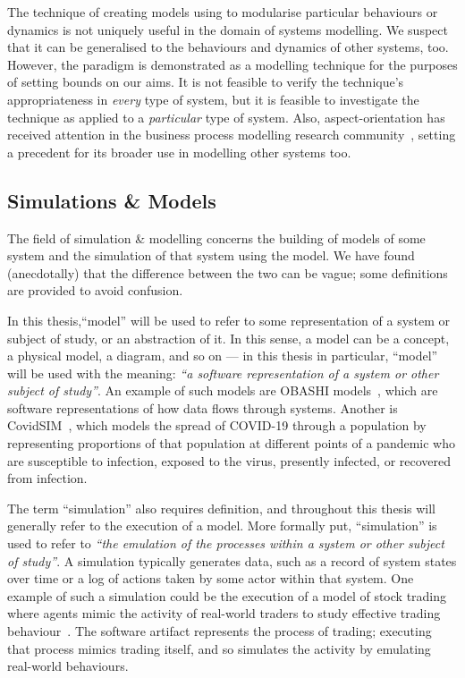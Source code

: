 The technique of creating models using \aspectorientation to modularise
particular behaviours or dynamics is not uniquely useful in the domain of
\sociotechnical systems modelling.
We suspect that it can be generalised to the behaviours and dynamics
of other systems, too. However, the paradigm is
demonstrated as a \sociotechnical modelling technique for the purposes of
setting bounds on our aims. It is not feasible to verify the
technique's appropriateness in \emph{every} type of system, but it is feasible to
investigate the technique as applied to a \emph{particular} type of system.
Also, aspect-orientation has received attention in the business process
modelling research
community~\cite{charfi2007ao4bpel,Cappelli_AOBPM,Charfi2006AspectOrientedWL},
setting a precedent for its broader use in modelling other \sociotechnical
systems too.


\subsection{Simulations \& Models}
\label{intro_defining_simulation_and_model}

The field of simulation \& modelling concerns the building of models of some
system and the simulation of that system using the model. We have found
(anecdotally) that the difference between the two can be vague; some definitions
are provided to avoid confusion.

In this thesis,``model'' will be used to refer to some representation of a
system or subject of study, or an abstraction of it. In this sense, a model can
be a concept, a physical model, a diagram, and so on --- in this thesis in
particular, ``model'' will be used with the meaning: \emph{``a software
representation of a system or other subject of study''}. An example of such
models are OBASHI models~\cite{obashimethodology}, which are software
representations of how data flows through \sociotechnical systems. Another is
CovidSIM~\cite{covidsim_tool}, which models the spread of COVID-19 through a
population by representing proportions of that population at different points of
a pandemic who are susceptible to infection, exposed to the virus, presently
infected, or recovered from infection.

The term ``simulation'' also requires definition, and throughout this thesis
will generally refer to the execution of a model. More formally put,
``simulation'' is used to refer to \emph{``the emulation of the processes within
a system or other subject of study''}. A simulation typically generates data,
such as a record of system states over time or a log of actions taken by some
actor within that system. One example of such a simulation could be the
execution of a model of stock trading where agents mimic the activity of
real-world traders to study effective trading behaviour~\cite{ZipTradersCliff}.
The software artifact represents the process of trading; executing that process
mimics trading itself, and so simulates the activity by emulating real-world
behaviours.


